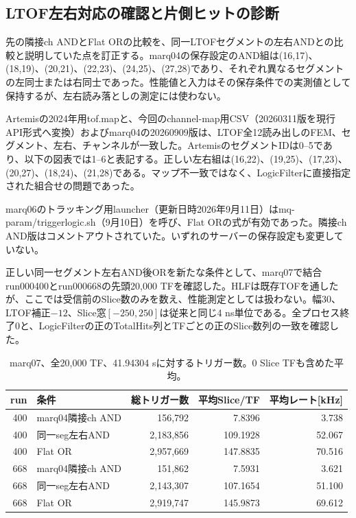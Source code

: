 \subsection{LTOF左右対応の確認と片側ヒットの診断}
先の隣接ch ANDとFlat ORの比較を、同一LTOFセグメントの左右ANDとの比較と説明していた点を訂正する。marq04の保存設定のAND組は(16,17)、(18,19)、(20,21)、(22,23)、(24,25)、(27,28)であり、それぞれ異なるセグメントの左同士または右同士であった。性能値と入力はその保存条件での実測値として保持するが、左右読み落としの測定には使わない。

Artemisの2024年用tof.mapと、今回のchannel-map用CSV（20260311版を現行API形式へ変換）およびmarq04の20260909版は、LTOF全12読み出しのFEM、セグメント、左右、チャンネルが一致した。ArtemisのセグメントIDは0--5であり、以下の図表では1--6と表記する。正しい左右組は(16,22)、(19,25)、(17,23)、(20,27)、(18,24)、(21,28)である。マップ不一致ではなく、LogicFilterに直接指定された組合せの問題であった。

marq06のトラッキング用launcher（更新日時2026年9月11日）はmq-param/triggerlogic.sh（9月10日）を呼び、Flat ORの式が有効であった。隣接ch AND版はコメントアウトされていた。いずれのサーバーの保存設定も変更していない。

正しい同一セグメント左右AND後ORを新たな条件として、marq07で結合run000400とrun000668の先頭20,000 TFを確認した。HLFは既存TOFを通したが、ここでは受信前のSlice数のみを数え、性能測定としては扱わない。幅30、LTOF補正$-12$、Slice窓$[-250,250]$は従来と同じ4 ns単位である。全プロセス終了0と、LogicFilterの正のTotalHits列とTFごとの正のSlice数列の一致を確認した。
\begin{table}[htbp]\centering\small
\caption{marq07、全20,000 TF、41.94304 sに対するトリガー数。0 Slice TFも含めた平均。}
\begin{tabular}{rlrrr}\hline
run & 条件 & 総トリガー数 & 平均Slice/TF & 平均レート[kHz] \\\hline
400 & marq04隣接ch AND & 156,792 & 7.8396 & 3.738 \\
400 & 同一seg左右AND & 2,183,856 & 109.1928 & 52.067 \\
400 & Flat OR & 2,957,669 & 147.8835 & 70.516 \\
668 & marq04隣接ch AND & 151,862 & 7.5931 & 3.621 \\
668 & 同一seg左右AND & 2,143,307 & 107.1654 & 51.100 \\
668 & Flat OR & 2,919,747 & 145.9873 & 69.612 \\
\hline\end{tabular}\end{table}

